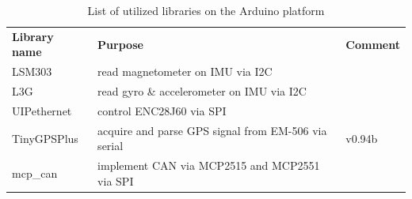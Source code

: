 \documentclass[ExampleMasters.tex]{subfiles}
\begin{document}
\begin{table}[!htb]
	\label{tab:list_of_arduino_libs}
	\begin{tabular}{lll}
		\textbf{Library name} & \textbf{Purpose}                                    & \textbf{Comment} \\
		LSM303                & read magnetometer on \gls{IMU} via I2C                    &                \cite{lsm303_github}  \\
		L3G                   & read gyro \& accelerometer on \gls{IMU} via I2C           &      
		\cite{l3g_github}            \\
		UIPethernet           &     control ENC28J60 via \gls{SPI}                                                 &             \cite{uip_ethernet_github}     \\
		TinyGPSPlus           & acquire and parse GPS signal from EM-506 via serial & v0.94b\cite{tiny_gps_plus_github}     \\
		mcp\_can & implement \gls{CAN} via MCP2515 and MCP2551 via \gls{SPI}      & \cite{mcp_can_github}
	\end{tabular}
	
	\caption{List of utilized libraries on the Arduino platform}
\end{table}
\end{document}
